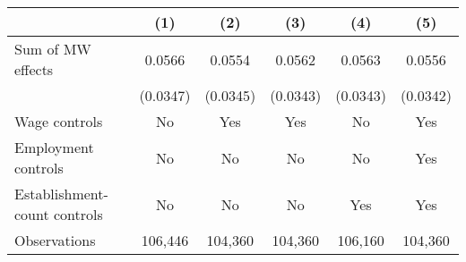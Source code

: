 {
\def\sym#1{\ifmmode^{#1}\else\(^{#1}\)\fi}
\begin{tabular}{l*{5}{c}}
\hline\hline
          &\multicolumn{1}{c}{(1)}         &\multicolumn{1}{c}{(2)}         &\multicolumn{1}{c}{(3)}         &\multicolumn{1}{c}{(4)}         &\multicolumn{1}{c}{(5)}         \\
\hline
Sum of MW effects&   0.0566         &   0.0554         &   0.0562         &   0.0563         &   0.0556         \\
          & (0.0347)         & (0.0345)         & (0.0343)         & (0.0343)         & (0.0342)         \\
\hline
Wage controls&       No         &      Yes         &      Yes         &       No         &      Yes         \\
Employment controls&       No         &       No         &       No         &       No         &      Yes         \\
Establishment-count controls&       No         &       No         &       No         &      Yes         &      Yes         \\
Observations&  106,446         &  104,360         &  104,360         &  106,160         &  104,360         \\
\hline\hline
\end{tabular}
}
